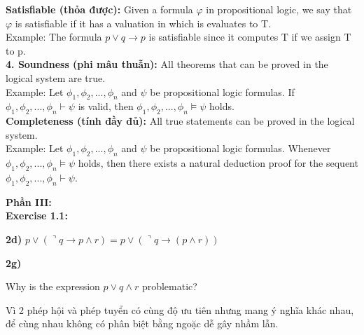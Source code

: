 \documentclass[a4paper]{article}
\begin{document}
\textbf{{\large\hspace{1 cm} Satisfiable (thỏa được): }}
{\large Given a formula $\varphi$ in propositional logic, we say that $\varphi$ is satisfiable if it has a valuation in which is evaluates to T.\\
	
	\hspace{1.5 cm} Example: The formula $p \vee q \rightarrow p$ is satisfiable since it computes T if we
	assign T to p.}\\

\textbf{{\large\hspace{0.5 cm} 4. Soundness (phi mâu thuẫn): }}
{\large All theorems that can be proved in the logical system are true.\\
	
	\hspace{1.5 cm} Example: Let $\phi_{1},\phi_{2}, . . . , \phi_{n}$ and $\psi$ be propositional logic formulas. If $\phi_{1},\phi_{2}, . . . , \phi_{n} \vdash \psi$ is valid, then $\phi_{1},\phi_{2}, . . . , \phi_{n} \models \psi$ holds.}\\

\textbf{{\large\hspace{1 cm} Completeness (tính đầy đủ): }}
{\large All true statements can be proved in the logical system.\\
	
	\hspace{1.5 cm} Example: Let $\phi_{1},\phi_{2}, . . . , \phi_{n}$ and $\psi$ be propositional logic formulas. Whenever $\phi_{1},\phi_{2}, . . . , \phi_{n} \models \psi$ holds, then there exists a natural deduction proof for the sequent $\phi_{1},\phi_{2}, . . . , \phi_{n} \vdash \psi$.}

\newpage

\textbf{{\Large Phần III: }}
\\

\textbf{\large\hspace{0.5cm} Exercise 1.1:}

\textbf{\large\hspace{1cm} 2d)}{\large\hspace{0.5cm}
	$	p \vee (\urcorner q \rightarrow p \wedge r) = p \vee (\urcorner q \rightarrow( p \wedge r))$}

\textbf{\large\hspace{1cm} 2g)}{\large\hspace{0.5cm}Why is the expression $p \vee q \wedge r$ problematic?

\hspace{1cm} Vì 2 phép hội và phép tuyển có cùng độ ưu tiên nhưng mang ý nghĩa khác nhau, để cùng nhau không có phân biệt bằng ngoặc dễ gây nhầm lẫn.}
\end{document}
